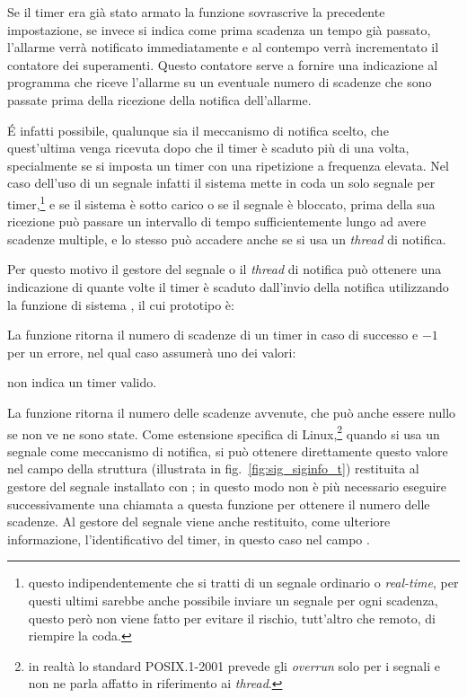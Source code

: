 Se il timer era già stato armato la funzione sovrascrive la precedente
impostazione, se invece si indica come prima scadenza un tempo già passato,
l'allarme verrà notificato immediatamente e al contempo verrà incrementato il
contatore dei superamenti. Questo contatore serve a fornire una indicazione al
programma che riceve l'allarme su un eventuale numero di scadenze che sono
passate prima della ricezione della notifica dell'allarme. 

É infatti possibile, qualunque sia il meccanismo di notifica scelto, che
quest'ultima venga ricevuta dopo che il timer è scaduto più di una volta,
specialmente se si imposta un timer con una ripetizione a frequenza
elevata. Nel caso dell'uso di un segnale infatti il sistema mette in coda un
solo segnale per timer,\footnote{questo indipendentemente che si tratti di un
  segnale ordinario o \textit{real-time}, per questi ultimi sarebbe anche
  possibile inviare un segnale per ogni scadenza, questo però non viene fatto
  per evitare il rischio, tutt'altro che remoto, di riempire la coda.} e se il
sistema è sotto carico o se il segnale è bloccato, prima della sua ricezione
può passare un intervallo di tempo sufficientemente lungo ad avere scadenze
multiple, e lo stesso può accadere anche se si usa un \textit{thread} di
notifica.

Per questo motivo il gestore del segnale o il \textit{thread} di notifica può
ottenere una indicazione di quante volte il timer è scaduto dall'invio della
notifica utilizzando la funzione di sistema , il cui
prototipo è:

\begin{funcproto}{
}

{La funzione ritorna il numero di scadenze di un timer in caso di successo e
  $-1$ per un errore, nel qual caso  assumerà uno dei valori:
  \begin{errlist}
  \item[\errcode{EINVAL}]  non indica un timer valido.
  \end{errlist}
}
\end{funcproto}

La funzione ritorna il numero delle scadenze avvenute, che può anche essere
nullo se non ve ne sono state. Come estensione specifica di Linux,\footnote{in
  realtà lo standard POSIX.1-2001 prevede gli \textit{overrun} solo per i
  segnali e non ne parla affatto in riferimento ai \textit{thread}.}  quando
si usa un segnale come meccanismo di notifica, si può ottenere direttamente
questo valore nel campo  della struttura 
(illustrata in fig.~\ref{fig:sig_siginfo_t}) restituita al gestore del segnale
installato con ; in questo modo non è più necessario eseguire
successivamente una chiamata a questa funzione per ottenere il numero delle
scadenze. Al gestore del segnale viene anche restituito, come ulteriore
informazione, l'identificativo del timer, in questo caso nel campo
.

